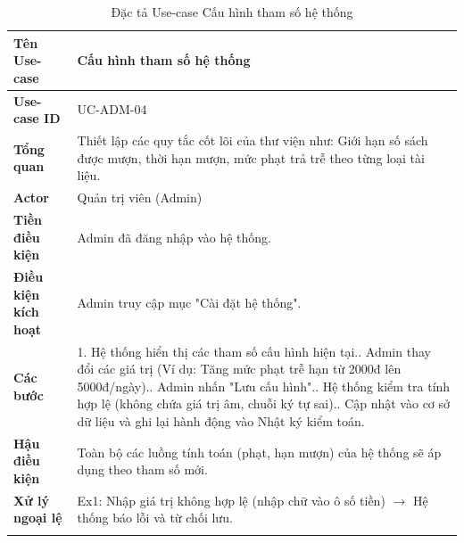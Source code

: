 \begin{longtable}{|p{3.5cm}|p{11.5cm}|}
    \hline
    \textbf{Tên Use-case} & \textbf{Cấu hình tham số hệ thống} \\
    \hline
    \textbf{Use-case ID} & UC-ADM-04 \\
    \hline
    \textbf{Tổng quan} & Thiết lập các quy tắc cốt lõi của thư viện như: Giới hạn số sách được mượn, thời hạn mượn, mức phạt trả trễ theo từng loại tài liệu. \\
    \hline
    \textbf{Actor} & Quản trị viên (Admin) \\
    \hline
    \textbf{Tiền điều kiện} & Admin đã đăng nhập vào hệ thống. \\
    \hline
    \textbf{Điều kiện kích hoạt} & Admin truy cập mục "Cài đặt hệ thống". \\
    \hline
    \textbf{Các bước} & 
    1. Hệ thống hiển thị các tham số cấu hình hiện tại.\newline
    2. Admin thay đổi các giá trị (Ví dụ: Tăng mức phạt trễ hạn từ 2000đ lên 5000đ/ngày).\newline
    3. Admin nhấn "Lưu cấu hình".\newline
    4. Hệ thống kiểm tra tính hợp lệ (không chứa giá trị âm, chuỗi ký tự sai).\newline
    5. Cập nhật vào cơ sở dữ liệu và ghi lại hành động vào Nhật ký kiểm toán. \\
    \hline
    \textbf{Hậu điều kiện} & Toàn bộ các luồng tính toán (phạt, hạn mượn) của hệ thống sẽ áp dụng theo tham số mới. \\
    \hline
    \textbf{Xử lý ngoại lệ} & 
    Ex1: Nhập giá trị không hợp lệ (nhập chữ vào ô số tiền) $\rightarrow$ Hệ thống báo lỗi và từ chối lưu. \\
    \hline
    \caption{Đặc tả Use-case Cấu hình tham số hệ thống}
\end{longtable}

